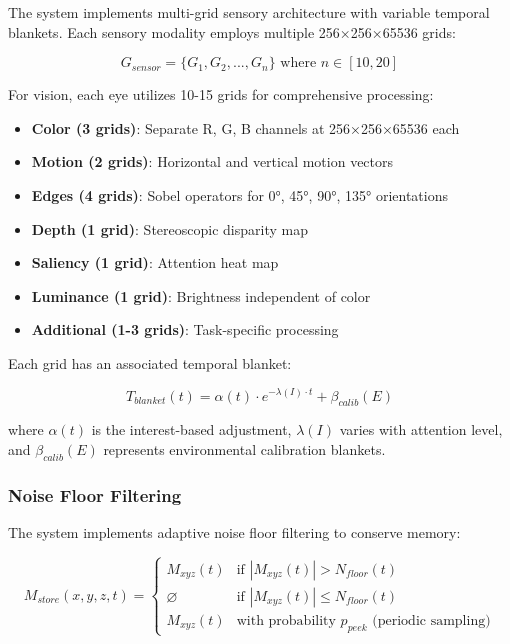 \documentclass[11pt,letterpaper]{article}
\begin{document}
The system implements multi-grid sensory architecture with variable temporal blankets. Each sensory modality employs multiple 256×256×65536 grids:

\begin{equation}
G_{sensor} = \{G_1, G_2, ..., G_n\} \text{ where } n \in [10,20]
\end{equation}

For vision, each eye utilizes 10-15 grids for comprehensive processing:
\begin{itemize}
\item \textbf{Color (3 grids)}: Separate R, G, B channels at 256×256×65536 each
\item \textbf{Motion (2 grids)}: Horizontal and vertical motion vectors
\item \textbf{Edges (4 grids)}: Sobel operators for 0°, 45°, 90°, 135° orientations
\item \textbf{Depth (1 grid)}: Stereoscopic disparity map
\item \textbf{Saliency (1 grid)}: Attention heat map
\item \textbf{Luminance (1 grid)}: Brightness independent of color
\item \textbf{Additional (1-3 grids)}: Task-specific processing
\end{itemize}

Each grid has an associated temporal blanket:

\begin{equation}
T_{blanket}(t) = \alpha(t) \cdot e^{-\lambda(I) \cdot t} + \beta_{calib}(E)
\end{equation}

where $\alpha(t)$ is the interest-based adjustment, $\lambda(I)$ varies with attention level, and $\beta_{calib}(E)$ represents environmental calibration blankets.

\subsubsection{Noise Floor Filtering}

The system implements adaptive noise floor filtering to conserve memory:

\begin{equation}
M_{store}(x,y,z,t) = \begin{cases}
M_{xyz}(t) & \text{if } |M_{xyz}(t)| > N_{floor}(t) \\
\varnothing & \text{if } |M_{xyz}(t)| \leq N_{floor}(t) \\
M_{xyz}(t) & \text{with probability } p_{peek} \text{ (periodic sampling)}
\end{cases}
\end{equation}
\end{document}
